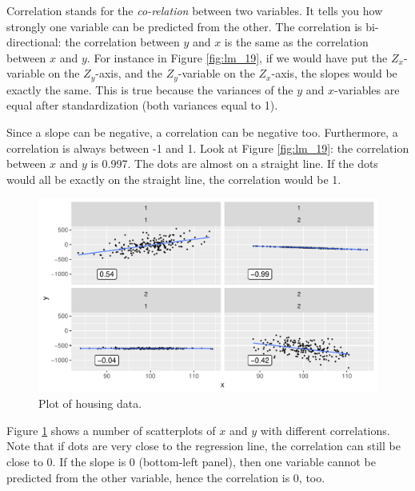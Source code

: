 \documentclass[]{book}\usepackage[]{graphicx}\usepackage[]{color}
\makeatletter
\def\maxwidth{ %
  \ifdim\Gin@nat@width>\linewidth
    \linewidth
  \else
    \Gin@nat@width
  \fi
}
\newenvironment{knitrout}{}{} %
\makeatother
\begin{document}
Correlation stands for the \textit{co-relation} between two variables. It tells you how strongly one variable can be predicted from the other. The correlation is bi-directional: the correlation between $y$ and $x$ is the same as the correlation between $x$ and $y$. For instance in Figure \ref{fig:lm_19}, if we would have put the $Z_x$-variable on the $Z_y$-axis, and the $Z_y$-variable on the $Z_x$-axis, the slopes would be exactly the same. This is true because the variances of the $y$ and $x$-variables are equal after standardization (both variances equal to 1).

Since a slope can be negative, a correlation can be negative too. Furthermore, a correlation is always between -1 and 1. Look at Figure \ref{fig:lm_19}: the correlation between $x$ and $y$ is 0.997. The dots are almost on a straight line. If the dots would all be exactly on the straight line, the correlation would be 1.

\begin{knitrout}
\color{fgcolor}\begin{figure}

{\centering \includegraphics[width=\maxwidth]{figure/lm_20-1} 

}

\caption[Plot of housing data]{Plot of housing data.}\label{fig:lm_20}
\end{figure}


\end{knitrout}


Figure \ref{fig:lm_20} shows a number of scatterplots of $x$ and $y$ with different correlations. Note that if dots are very close to the regression line, the correlation can still be close to 0. If the slope is 0 (bottom-left panel), then one variable cannot be predicted from the other variable, hence the correlation is 0, too.
\end{document}
